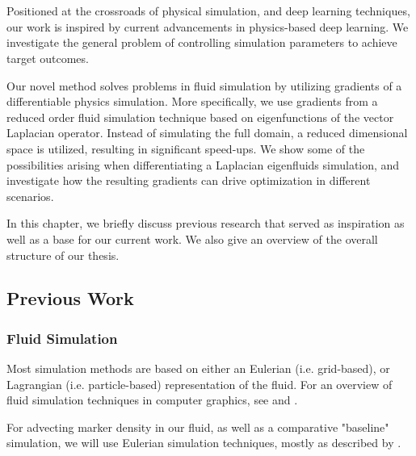 \chapter{\bevezetes}

Positioned at the crossroads of physical simulation, and deep learning
techniques, our work is inspired by current advancements in physics-based deep
learning. We investigate the general problem of controlling simulation
parameters to achieve target outcomes.

Our novel method solves problems in fluid simulation by utilizing gradients of
a differentiable physics simulation. More specifically, we use gradients from
a reduced order fluid simulation technique based on eigenfunctions of the vector
Laplacian operator. Instead of simulating the full domain, a reduced dimensional
space is utilized, resulting in significant speed-ups. We show some of the
possibilities arising when differentiating a Laplacian eigenfluids simulation,
and investigate how the resulting gradients can drive optimization in different
scenarios.


In this chapter, we briefly discuss previous research that served as inspiration
as well as a base for our current work. We also give an overview of the overall
structure of our thesis. 

\section{Previous Work}
\subsection{Fluid Simulation}
Most simulation methods are based on either an Eulerian (i.e.  grid-based), or
Lagrangian (i.e. particle-based) representation of the fluid.  For an overview
of fluid simulation techniques in computer graphics, see \cite{FluidNotes} and
\cite{BridsonFluid}. 

For advecting marker density in our fluid, as well as a comparative "baseline"
simulation, we will use Eulerian simulation techniques, mostly as described by
\cite{StableFluids}.

